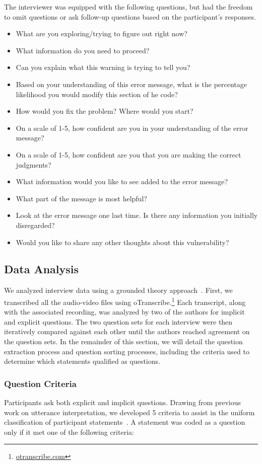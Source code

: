 \documentclass[conference]{IEEEtran}
\begin{document}
The interviewer was equipped with the following questions, but had the freedom to omit questions or ask follow-up questions based on the participant's responses.
\begin{itemize}
\item What are you exploring/trying to figure out right now?
\item What information do you need to proceed?
\item Can you explain what this warning is trying to tell you?
\item Based on your understanding of this error message, what is the percentage likelihood you would modify this section of he code?
\item How would you fix the problem? Where would you start?
\item On a scale of 1-5, how confident are you in your understanding of the error message?
\item On a scale of 1-5, how confident are you that you are making the correct judgments?
\item What information would you like to see added to the error message?
\item What part of the message is most helpful?
\item Look at the error message one last time. Is there any information you initially disregarded?
\item Would you like to share any other thoughts about this vulnerability?
\end{itemize}

\subsection{Data Analysis}
\label{dataAnalysis}
We analyzed interview data using a grounded theory approach~\cite{glaser2009discovery}. 
First, we transcribed all the audio-video files using oTranscribe.\footnote{\url{otranscribe.com}}
Each transcript, along with the associated recording, was analyzed by two of the authors for implicit and explicit questions. 
The two question sets for each interview were then iteratively compared against each other until the authors reached agreement on the question sets. 
In the remainder of this section, we will detail the question extraction process and question sorting processes, including the criteria used to determine which statements qualified as questions.
\subsubsection{Question Criteria}
Participants ask both explicit and implicit questions. 
Drawing from previous work on utterance interpretation, we developed 5 criteria to assist in the uniform classification of participant statements~\cite{letovsky1987cognitive}. 
A statement was coded as a question only if it met one of the following criteria:
\end{document}

